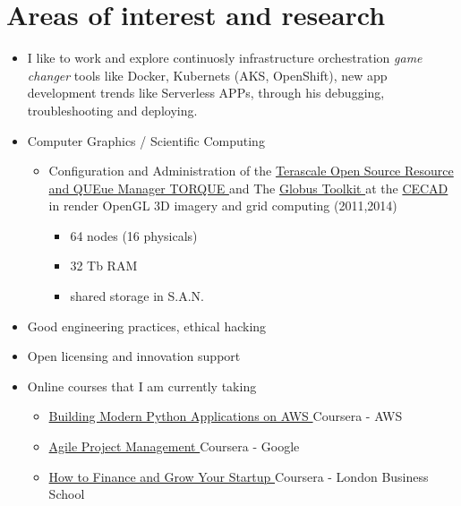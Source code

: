 \documentclass[overlapped,line,final]{res}
\begin{document}
\begin{resume}
\begin{itemize}
\end{itemize} 

\section{\sc Areas of interest and research}
\vspace{0.5cm}
\begin{itemize}
	\item I like to work and explore continuosly infrastructure orchestration \textit{game changer} tools like Docker, Kubernets (AKS, OpenShift), new app development trends like Serverless APPs, through his debugging, troubleshooting and deploying.
    \item Computer Graphics / Scientific Computing
	    \begin{itemize}
		\item Configuration and Administration of the \href {https://github.com/adaptivecomputing/torque#torque-resource-manager}{Terascale Open Source Resource and QUEue Manager TORQUE } and The \href{https://toolkit.globus.org/}{Globus Toolkit } at the \href{https://cecad.udistrital.edu.co/}{CECAD } in render OpenGL 3D imagery and grid computing (2011,2014)
	 \begin{itemize}
	  \item 64 nodes (16 physicals)
	  \item 32 Tb RAM
	  \item shared storage in S.A.N.
	 \end{itemize}
	\end{itemize}
    	\item Good engineering practices, ethical hacking
	\item Open licensing and innovation support
	\item Online courses that I am currently taking
		\begin{itemize}
			\item \href{https://www.coursera.org/learn/building-modern-python-applications-on-aws}{Building Modern Python Applications on AWS } Coursera - AWS
			\item \href{https://www.coursera.org/learn/agile-project-management}{Agile Project Management } Coursera - Google
			\item \href{https://www.coursera.org/learn/startup-financing-without-vc/}{How to Finance and Grow Your Startup } Coursera - London Business School

\end{itemize}
\end{itemize}
\end{resume}
\end{document}
